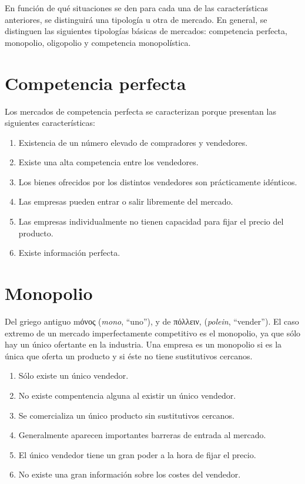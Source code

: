 \documentclass[
]{krantz}
\providecommand{\tightlist}{%
  \setlength{\itemsep}{0pt}\setlength{\parskip}{0pt}}
\begin{document}
En función de qué situaciones se den para cada una de las características anteriores, se distinguirá una tipología u otra de mercado. En general, se distinguen las siguientes tipologías básicas de mercados: competencia perfecta, monopolio, oligopolio y competencia monopolística.

\hypertarget{competencia-perfecta}{%
\section{Competencia perfecta}\label{competencia-perfecta}}

Los mercados de competencia perfecta se caracterizan porque presentan las siguientes características:

\begin{enumerate}
\def\labelenumi{\arabic{enumi}.}
\tightlist
\item
  Existencia de un número elevado de compradores y vendedores.
\item
  Existe una alta competencia entre los vendedores.
\item
  Los bienes ofrecidos por los distintos vendedores son prácticamente idénticos.
\item
  Las empresas pueden entrar o salir libremente del mercado.
\item
  Las empresas individualmente no tienen capacidad para fijar el precio del producto.
\item
  Existe información perfecta.
\end{enumerate}

\hypertarget{monopolio}{%
\section{Monopolio}\label{monopolio}}

Del griego antiguo mόνος (\emph{mono}, ``uno''), y de πόλλειν, (\emph{polein}, ``vender'').
El caso extremo de un mercado imperfectamente competitivo es el monopolio, ya que sólo hay un único ofertante en la industria. Una empresa es un monopolio si es la única que oferta un producto y si éste no tiene sustitutivos cercanos.

\begin{enumerate}
\def\labelenumi{\arabic{enumi}.}
\tightlist
\item
  Sólo existe un único vendedor.
\item
  No existe compentencia alguna al existir un único vendedor.
\item
  Se comercializa un único producto sin sustitutivos cercanos.
\item
  Generalmente aparecen importantes barreras de entrada al mercado.
\item
  El único vendedor tiene un gran poder a la hora de fijar el precio.
\item
  No existe una gran información sobre los costes del vendedor.
\end{enumerate}
\end{document}
